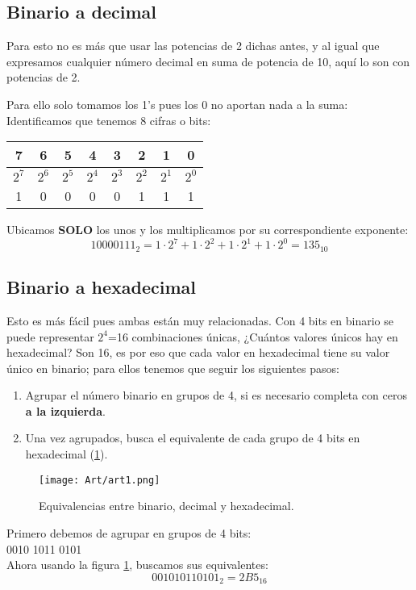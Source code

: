 \documentclass[
	12pt, %
	fleqn, %
	a4paper, %
]{LegrandOrangeBook}
\begin{document}
\subsection{Binario a decimal}
Para esto no es más que usar las potencias de 2 dichas antes, y al igual que expresamos cualquier número decimal en suma de potencia de 10, aquí lo son con potencias de 2.
\begin{example}
Para ello solo tomamos los 1's pues los 0 no aportan nada a la suma:\\
Identificamos que tenemos 8 cifras o bits:
\begin{center}
\begin{tabular}{|c|c|c|c|c|c|c|c|}
\hline
7     & 6     & 5     & 4     & 3     & 2     & 1     & 0     \\ \hline
$2^7$ & $2^6$ & $2^5$ & $2^4$ & $2^3$ & $2^2$ & $2^1$ & $2^0$ \\ \hline
1     & 0     & 0     & 0     & 0     & 1     & 1     & 1     \\ \hline
\end{tabular}
\end{center}
Ubicamos \textbf{SOLO} los unos y los multiplicamos por su correspondiente exponente:
\begin{displaymath}
1000 0111_2=1\cdot 2^7 + 1\cdot 2^2 + 1\cdot 2^1 + 1\cdot 2^0=135_{10}
\end{displaymath}
\end{example}
\subsection{Binario a hexadecimal}
Esto es más fácil pues ambas están muy relacionadas. Con 4 bits en binario se puede representar $2^4$=16 combinaciones únicas, ¿Cuántos valores únicos hay en hexadecimal? Son 16, es por eso que cada valor en hexadecimal tiene su valor único en binario; para ellos tenemos que seguir los siguientes pasos:
\begin{enumerate}
\item Agrupar el número binario en grupos de 4, si es necesario completa con  ceros \textbf{a la izquierda}.
\item Una vez agrupados, busca el equivalente de cada grupo de 4 bits en hexadecimal (\ref{fig: bin a hex}).
\end{enumerate}
\begin{figure}[]
\centering
\texttt{[image: Art/art1.png]}
\caption{Equivalencias entre binario, decimal y hexadecimal.}
\label{fig: bin a hex}
\end{figure}
\begin{example}
Primero debemos de agrupar en grupos de 4 bits:\\
0010 1011 0101\\
Ahora usando la figura \ref{fig: bin a hex}, buscamos sus equivalentes:
\begin{displaymath}
0010 1011 0101_2=2B5_{16}
\end{displaymath}
\end{example}
\end{document}
